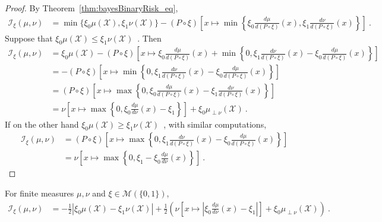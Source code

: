 \begin{proof}\leanok
{}
By Theorem~\ref{thm:bayesBinaryRisk_eq},
\begin{align*}
\mathcal I_\xi(\mu, \nu)
&= \min\{\xi_0\mu(\mathcal X), \xi_1\nu(\mathcal X)\} - (P \circ \xi)\left[x \mapsto \min \left\{\xi_0\frac{d \mu}{d(P \circ \xi)}(x), \xi_1\frac{d \nu}{d(P \circ \xi)}(x)\right\}\right]
\: .
\end{align*}
Suppose that $\xi_0\mu(\mathcal X) \le \xi_1\nu(\mathcal X)$~. Then
\begin{align*}
\mathcal I_\xi(\mu, \nu)
&= \xi_0\mu(\mathcal X) - (P \circ \xi)\left[x \mapsto \xi_0\frac{d \mu}{d(P \circ \xi)}(x) + \min \left\{0 , \xi_1\frac{d \nu}{d(P \circ \xi)}(x) - \xi_0\frac{d \mu}{d(P \circ \xi)}(x)\right\}\right]
\\
&= - (P \circ \xi)\left[x \mapsto \min \left\{0 , \xi_1\frac{d \nu}{d(P \circ \xi)}(x) - \xi_0\frac{d \mu}{d(P \circ \xi)}(x) \right\}\right]
\\
&= (P \circ \xi)\left[x \mapsto \max \left\{0 , \xi_0\frac{d \mu}{d(P \circ \xi)}(x) - \xi_1\frac{d \nu}{d(P \circ \xi)}(x) \right\}\right]
\\
&= \nu\left[ x \mapsto \max \left\{0 , \xi_0\frac{d \mu}{d\nu}(x) - \xi_1 \right\} \right] + \xi_0 \mu_{\perp \nu}(\mathcal X)
\: .
\end{align*}
If on the other hand $\xi_0\mu(\mathcal X) \ge \xi_1\nu(\mathcal X)$~, with similar computations,
\begin{align*}
\mathcal I_\xi(\mu, \nu)
&= (P \circ \xi)\left[x \mapsto \max \left\{0 , \xi_1\frac{d \nu}{d(P \circ \xi)}(x) - \xi_0\frac{d \mu}{d(P \circ \xi)}(x) \right\}\right]
\\
&= \nu\left[ x \mapsto \max \left\{0 , \xi_1 - \xi_0\frac{d \mu}{d\nu}(x) \right\} \right]
\: .
\end{align*}
\end{proof}

\begin{corollary}
  \label{cor:statInfo_eq_integral_abs}
  \leanok
  For finite measures $\mu, \nu$ and $\xi \in \mathcal M(\{0,1\})$,
  \begin{align*}
  \mathcal I_\xi(\mu, \nu)
  &= -\frac{1}{2} \left\vert\xi_0 \mu(\mathcal X) - \xi_1 \nu(\mathcal X)\right\vert + \frac{1}{2}\left( \nu\left[ x \mapsto \left\vert\xi_0\frac{d \mu}{d\nu}(x) - \xi_1 \right\vert \right]  + \xi_0 \mu_{\perp \nu}(\mathcal X)\right)
  \: .
  \end{align*}
\end{corollary}

